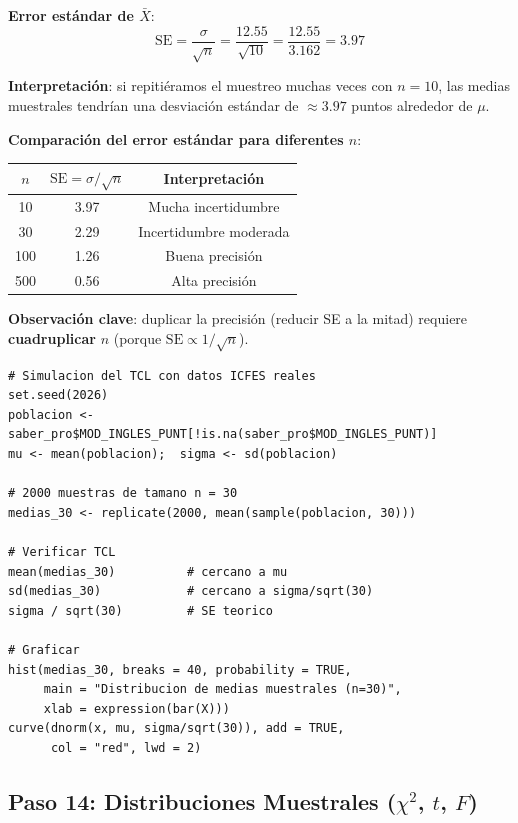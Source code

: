 \documentclass[11pt, a4paper]{article}
\begin{document}
\textbf{Error est\'andar de $\bar{X}$}:
\[
\text{SE} = \frac{\sigma}{\sqrt{n}} = \frac{12.55}{\sqrt{10}} = \frac{12.55}{3.162} = \boxed{3.97}
\]

\textbf{Interpretaci\'on}: si repiti\'eramos el muestreo muchas veces con $n=10$,
las medias muestrales tendr\'ian una desviaci\'on est\'andar de $\approx 3.97$ puntos alrededor de $\mu$.

\textbf{Comparaci\'on del error est\'andar para diferentes $n$}:

\begin{center}
\begin{tabular}{ccc}
\toprule
$n$ & $\text{SE} = \sigma/\sqrt{n}$ & Interpretaci\'on \\
\midrule
10  & 3.97 & Mucha incertidumbre \\
30  & 2.29 & Incertidumbre moderada \\
100 & 1.26 & Buena precisi\'on \\
500 & 0.56 & Alta precisi\'on \\
\bottomrule
\end{tabular}
\end{center}

\textbf{Observaci\'on clave}: duplicar la precisi\'on (reducir SE a la mitad) requiere
\textbf{cuadruplicar} $n$ (porque $\text{SE} \propto 1/\sqrt{n}$).

\begin{lstlisting}
# Simulacion del TCL con datos ICFES reales
set.seed(2026)
poblacion <- saber_pro$MOD_INGLES_PUNT[!is.na(saber_pro$MOD_INGLES_PUNT)]
mu <- mean(poblacion);  sigma <- sd(poblacion)

# 2000 muestras de tamano n = 30
medias_30 <- replicate(2000, mean(sample(poblacion, 30)))

# Verificar TCL
mean(medias_30)          # cercano a mu
sd(medias_30)            # cercano a sigma/sqrt(30)
sigma / sqrt(30)         # SE teorico

# Graficar
hist(medias_30, breaks = 40, probability = TRUE,
     main = "Distribucion de medias muestrales (n=30)",
     xlab = expression(bar(X)))
curve(dnorm(x, mu, sigma/sqrt(30)), add = TRUE,
      col = "red", lwd = 2)
\end{lstlisting}

\subsection{Paso 14: Distribuciones Muestrales ($\chi^2$, $t$, $F$)}
\end{document}
